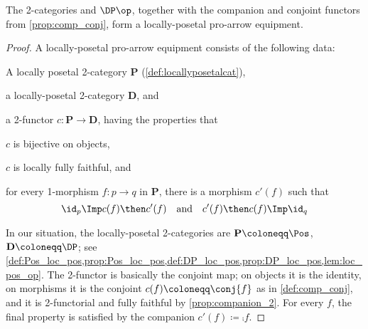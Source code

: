 \begin{theorem}
  The 2-categories \Pos and $\DP\op$, together with the companion and conjoint functors from \cref{prop:comp_conj}, form a locally-posetal pro-arrow equipment.
\end{theorem}
\begin{proof}
  A locally-posetal pro-arrow equipment consists of the following data:
  \begin{compactitem}
    \item A locally posetal 2-category $\mathbf{P}$ (\cref{def:locallyposetalcat}),
    \item a locally-posetal 2-category $\mathbf{D}$, and
    \item a 2-functor $c\colon\mathbf{P}\to\mathbf{D}$, having the properties that
    \begin{compactitem}
      \item $c$ is bijective on objects,
      \item $c$ is locally fully faithful, and
      \item for every 1-morphism $f\colon p\to q$ in $\mathbf{P}$, there is a morphism $c'(f)$ such that
      \begin{equation}
        \id_p\Imp c(f)\then c'(f)\quad\text{and}\quad c'(f)\then c(f)\Imp\id_q
      \end{equation}
    \end{compactitem}
  \end{compactitem}
  In our situation, the locally-posetal 2-categories are $\mathbf{P}\coloneqq\Pos$, $\mathbf{D}\coloneqq\DP$; see \cref{def:Pos_loc_pos,prop:Pos_loc_pos,def:DP_loc_pos,prop:DP_loc_pos,lem:loc_pos_op}. The 2-functor is basically the conjoint map; on objects it is the identity, on morphisms it is the conjoint $c(f)\coloneqq\conj{f}$ as in \cref{def:comp_conj}, and it is 2-functorial and fully faithful by \cref{prop:companion_2}. For every $f$, the final property is satisfied by the companion $c'(f)\coloneqq \comp{f}$.
\end{proof}


